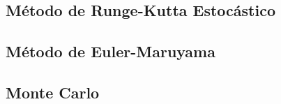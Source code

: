 \subsection{Método de Runge-Kutta Estocástico}

\subsection{Método de Euler-Maruyama}

\subsection{Monte Carlo}